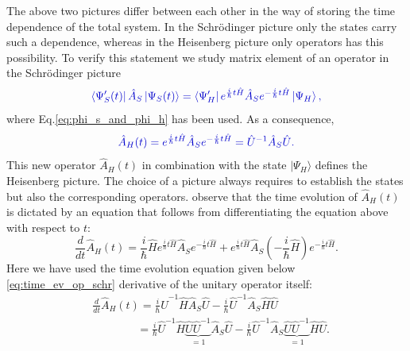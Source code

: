 \documentclass[12pt, titlepage]{article}
\begin{document}
The above two pictures differ between each other in the way of storing the time dependence of the total system. In the Schrödinger picture only the states carry such a dependence, whereas in the Heisenberg picture only operators has this possibility. To verify this statement we study matrix element of an operator in the Schrödinger picture
\begin{equation}\label{eq:matrix_ele_time_dep}
\textcolor[RGB]{0,0,204}{
\bra{\Psi^{\prime}_{S}(t)}\hat{A}_{S}\ket{\Psi_{S} (t)}
=\bra{\Psi^{\prime}_{H}}e^{\frac{i}{\hbar}t\hat{H}}\hat{A}_{S}
e^{-\frac{i}{\hbar}t\hat{H}}\ket{\Psi_{H} },
}
\end{equation}
where Eq.\eqref{eq:phi_s_and_phi_h} has been used. As a consequence, 
\begin{equation}\label{eq:S-H-Operator_Trafo}
\textcolor[RGB]{0,0,204}{
\hat{A}_{H}(t)=e^{\frac{i}{\hbar}t\hat{H}}\hat{A}_{S}
e^{-\frac{i}{\hbar}t\hat{H}}=\hat{U}^{-1}\hat{A}_{S}\hat{U}.
}
\end{equation}
This new operator $ \hat{A}_{H}(t) $ in combination with the state $ \vert\Psi_{H} \rangle$ defines the Heisenberg picture.
The choice of a picture always requires to establish the states but also the corresponding operators. 
observe that the time evolution of $ \hat{A}_{H}(t) $  is dictated by an equation that follows from differentiating the equation above with respect to $ t $:
\begin{equation}
\frac{d}{dt}\hat{A}_{H}(t)
=\frac{i}{\hbar}\hat{H}
e^{\frac{i}{\hbar}t \hat{H}}
\hat{A}_{S}
e^{-\frac{i}{\hbar}t \hat{H}}
+e^{\frac{i}{\hbar}t \hat{H}}
\hat{A}_{S}
\left( -\frac{i}{\hbar}\hat{H}\right) 
e^{-\frac{i}{\hbar}t \hat{H}}.
\end{equation}
Here we have used the  time evolution equation given below \eqref{eq:time_ev_op_schr} derivative of the unitary operator itself:
\begin{equation}\label{time_evo_seven}
\begin{split}
&\frac{d}{dt}\hat{A}_{H}(t)
	=\frac{i}{\hbar}
	\hat{U}^{-1}\hat{H}\hat{A}_{S}\hat{U}
	-
	\frac{i}{\hbar}
	\hat{U}^{-1}\hat{A}_{S}\hat{H}\hat{U}
	\\
&\qquad\qquad=\frac{i}{\hbar}
	\hat{U}^{-1}\hat{H}\underbrace{\hat{U}\hat{U}^{-1}}_{=1}\hat{A}_{S}\hat{U}
	-
	\frac{i}{\hbar}
	\hat{U}^{-1}\hat{A}_{S}\underbrace{\hat{U}\hat{U}^{-1}}_{=1}\hat{H}\hat{U}.
\end{split}
\end{equation}
\end{document}
